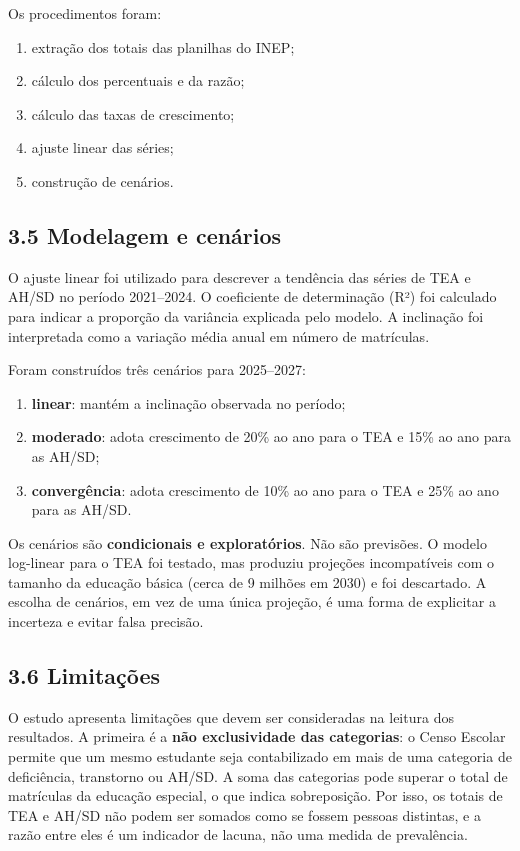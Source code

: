 Os procedimentos foram:

\begin{enumerate}
\def\labelenumi{\arabic{enumi}.}
\tightlist
\item
  extração dos totais das planilhas do INEP;
\item
  cálculo dos percentuais e da razão;
\item
  cálculo das taxas de crescimento;
\item
  ajuste linear das séries;
\item
  construção de cenários.
\end{enumerate}

\subsection{3.5 Modelagem e cenários}\label{modelagem-e-cenuxe1rios}

O ajuste linear foi utilizado para descrever a tendência das séries de
TEA e AH/SD no período 2021--2024. O coeficiente de determinação (R²)
foi calculado para indicar a proporção da variância explicada pelo
modelo. A inclinação foi interpretada como a variação média anual em
número de matrículas.

Foram construídos três cenários para 2025--2027:

\begin{enumerate}
\def\labelenumi{\alph{enumi})}
\item
  \textbf{linear}: mantém a inclinação observada no período;
\item
  \textbf{moderado}: adota crescimento de 20\% ao ano para o TEA e 15\%
  ao ano para as AH/SD;
\item
  \textbf{convergência}: adota crescimento de 10\% ao ano para o TEA e
  25\% ao ano para as AH/SD.
\end{enumerate}

Os cenários são \textbf{condicionais e exploratórios}. Não são
previsões. O modelo log-linear para o TEA foi testado, mas produziu
projeções incompatíveis com o tamanho da educação básica (cerca de 9
milhões em 2030) e foi descartado. A escolha de cenários, em vez de uma
única projeção, é uma forma de explicitar a incerteza e evitar falsa
precisão.

\subsection{3.6 Limitações}\label{limitauxe7uxf5es}

O estudo apresenta limitações que devem ser consideradas na leitura dos
resultados. A primeira é a \textbf{não exclusividade das categorias}: o
Censo Escolar permite que um mesmo estudante seja contabilizado em mais
de uma categoria de deficiência, transtorno ou AH/SD. A soma das
categorias pode superar o total de matrículas da educação especial, o
que indica sobreposição. Por isso, os totais de TEA e AH/SD não podem
ser somados como se fossem pessoas distintas, e a razão entre eles é um
indicador de lacuna, não uma medida de prevalência.

